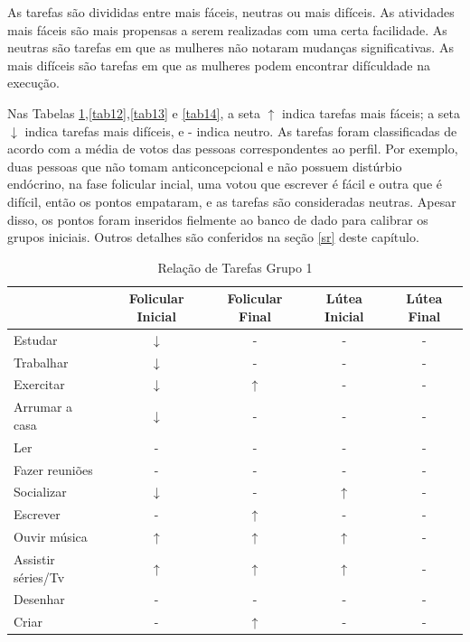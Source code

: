 As tarefas são divididas entre mais fáceis, neutras ou mais difíceis. As atividades mais fáceis 
são mais propensas a serem realizadas com uma certa facilidade. As neutras são tarefas em que as mulheres não 
notaram mudanças significativas. As mais difíceis são tarefas em que as mulheres podem encontrar difículdade 
na execução.

Nas Tabelas \ref{tab11},\ref{tab12},\ref{tab13} e \ref{tab14}, a seta $\uparrow$ indica tarefas mais fáceis; a seta $\downarrow$ indica tarefas mais difíceis, e - indica neutro. As tarefas 
foram classificadas de acordo com a média de votos das pessoas correspondentes ao perfil. Por exemplo, duas 
pessoas que não tomam anticoncepcional e não possuem distúrbio endócrino, na fase folicular incial, 
uma votou que escrever é fácil e outra que é difícil, então os pontos empataram, e as tarefas são consideradas neutras.
Apesar disso, os pontos foram inseridos fielmente ao banco de dado para calibrar os grupos iniciais. Outros detalhes são conferidos
na seção \ref{sr} deste capítulo.

\begin{table}[]
    \centering
    \caption{Relação de Tarefas Grupo 1}
    \label{tab11}
    \begin{tabular}{|l|c|c|c|c|}
    \hline
    \rowcolor[HTML]{C0C0C0} 
    \multicolumn{1}{|c|}{\cellcolor[HTML]{C0C0C0}Tarefas recomendadas}  & Folicular Inicial & Folicular Final  & Lútea Inicial& Lútea Final \\ \hline
    Estudar & $\downarrow$  & - & - & - \\ \hline
    \rowcolor[HTML]{EFEFEF} 
    Trabalhar & $\downarrow$ & -  & -&  -  \\ \hline
    Exercitar & $\downarrow$ & $\uparrow$ & - &  -  \\ \hline
    \rowcolor[HTML]{EFEFEF} 
    Arrumar a casa  & $\downarrow$ & -  & - & - \\ \hline
    Ler & - & -  & - & - \\ \hline
    \rowcolor[HTML]{EFEFEF} 
    Fazer reuniões & - & - & - & - \\ \hline
    \rowcolor[HTML]{EFEFEF} 
    Socializar & $\downarrow$ & - & $\uparrow$ & - \\ \hline
    \rowcolor[HTML]{EFEFEF} 
    Escrever & - & $\uparrow$  & - & - \\ \hline
    Ouvir música & $\uparrow$ & $\uparrow$ & $\uparrow$ & - \\ \hline
    \rowcolor[HTML]{EFEFEF} 
    Assistir séries/Tv & $\uparrow$ & $\uparrow$ & $\uparrow$ & - \\ \hline
    Desenhar & - & -  & - & - \\ \hline
    \rowcolor[HTML]{EFEFEF} 
    Criar & - & $\uparrow$  & - & - \\ \hline
    \end{tabular}
    \end{table}

